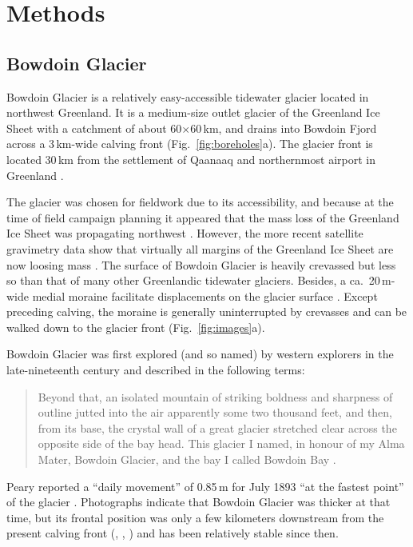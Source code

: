 \documentclass[utf8]{article}
\begin{document}
\section{Methods}

\subsection{Bowdoin Glacier}

    Bowdoin Glacier is a relatively easy-accessible tidewater glacier located
    in northwest Greenland. It is a medium-size outlet glacier of the Greenland
    Ice Sheet with a catchment of about 60$\times$60\,km, and drains into
    Bowdoin Fjord across a 3\,km-wide calving front
    (Fig.~\ref{fig:boreholes}a). The glacier front is located 30\,km from the
    settlement of Qaanaaq and northernmost airport in Greenland
    \citep[Fig.~1]{Sugiyama.etal.2015}.

    The glacier was chosen for fieldwork due to its accessibility, and
    because at the time of field campaign planning it appeared that the mass
    loss of the Greenland Ice Sheet was propagating northwest
    \citep{Khan.etal.2010}. However, the more recent satellite gravimetry data
    show that virtually all margins of the Greenland Ice Sheet are now loosing
    mass \citep{Groh.Horwath.2016}. The surface of Bowdoin Glacier
    is heavily crevassed but less so than that of many other Greenlandic
    tidewater glaciers. Besides, a ca.~20\,m-wide medial moraine facilitate
    displacements on the glacier surface \citep[Figs.~68]{Chamberlin.1897}.
    Except preceding calving, the moraine is generally uninterrupted by
    crevasses and can be walked down to the glacier front
    (Fig.~\ref{fig:images}a).

    Bowdoin Glacier was first explored (and so named) by western explorers in
    the late-nineteenth century and described in the following terms:
    \begin{quote}
        Beyond that, an isolated mountain of striking boldness and sharpness of
        outline jutted into the air apparently some two thousand feet, and
        then, from its base, the crystal wall of a great glacier stretched
        clear across the opposite side of the bay head. This glacier I named,
        in honour of my Alma Mater, Bowdoin Glacier, and the bay I called
        Bowdoin Bay \citep[p.~393--394]{Peary.1898}.
    \end{quote}
    Peary reported a ``daily movement'' of 0.85\,m for July 1893 ``at the
    fastest point'' of the glacier \citep{Chamberlin.1894}.
    Photographs indicate that Bowdoin Glacier was thicker at that time, but its
    frontal position was only a few kilometers downstream from the present
    calving front (\citealp[p.~668]{Chamberlin.1895}, \citealp[Figs.~64
    and~65]{Chamberlin.1897}, \citealp[Fig.~1]{Podolskiy.etal.2016}) and has
    been relatively stable since then.
\end{document}
